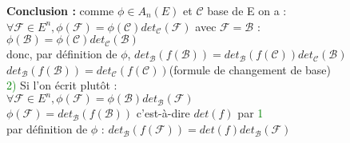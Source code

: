 \documentclass{article}
\begin{document}
{\bf Conclusion :} comme $\phi \in A_n(E)$ et $\mathcal C$ base de E on a : \\
$\forall \mathcal F \in E^n, \phi(\mathcal F)= \phi(\mathcal C)det_{\mathcal C}(\mathcal F)$
avec $\mathcal F=\mathcal B$ : \\
$\phi(\mathcal B)=\phi(\mathcal C) det_{\mathcal C}(\mathcal B)$ \\
donc, par définition de $\phi$, $det_{\mathcal B}(f(\mathcal B))= det_{\mathcal B}(f(\mathcal C))det_{\mathcal C}(\mathcal B)$ \\
$det_{\mathcal B}(f(\mathcal B))=det_{\mathcal C}(f(\mathcal C))$(formule de changement de base) \\
\textcolor{green}{2)} Si l'on écrit plutôt : \\
$\forall \mathcal F \in E^n, \phi(\mathcal F)= \phi(\mathcal B)det_{\mathcal B}(\mathcal F)$ \\
$\phi(\mathcal F)=det_{\mathcal B}(f(\mathcal B))$ c'est-à-dire $det(f)$ par \textcolor{green}{1} \\
par définition de $\phi$ : $det_{\mathcal B}(f(\mathcal F))=det(f)det_{\mathcal B}(\mathcal F)$
\end{document}
